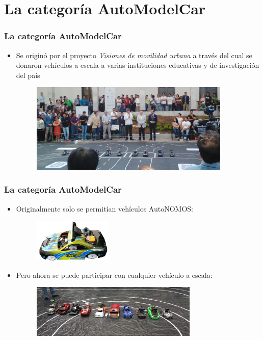 \section{La categoría AutoModelCar}

\begin{frame}\frametitle{La categoría AutoModelCar}
  \begin{itemize}
  \item Se originó por el proyecto \textit{Visiones de movilidad urbana} a través del cual se donaron vehículos a escala a varias instituciones educativas y de investigación del país
    \begin{figure}
      \centering
      \includegraphics[width=0.9\textwidth]{Figuras/VisionesDeMovilidadUrbana.jpg}
    \end{figure}
  \end{itemize}
\end{frame}

\begin{frame}\frametitle{La categoría AutoModelCar}
  \begin{itemize}
  \item Originalmente solo se permitían vehículos AutoNOMOS:
    \begin{figure}
      \centering
      \includegraphics[width=0.35\textwidth]{Figuras/AutoNOMOS.jpg}
    \end{figure}
  \item Pero ahora se puede participar con cualquier vehículo a escala:
    \begin{figure}
      \centering
      \includegraphics[width=0.75\textwidth]{Figuras/AutoModelCarCars.jpg}
    \end{figure}
  \end{itemize}
\end{frame}

